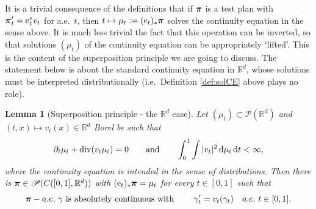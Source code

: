 \documentclass[11pt]{article}
\numberwithin{equation}{section}
\newtheorem{lemma}[theorem]{Lemma}
\newcommand{\R}{\mathbb{R}}
\newcommand{\ppi}{{\mbox{\boldmath$\pi$}}}
\newcommand{\pr}{\mathscr P}
\newcommand{\e}{{\rm e}}
\renewcommand{\d}{{\rm d}}
\renewcommand{\div}{{\rm div}}
\begin{document}
It is a trivial consequence of the definitions that if $\ppi$ is a test plan with $\ppi'_t=\e_t^*v_t$ for a.e.\ $t$, then $t\mapsto\mu_t:=(\e_t)_*\ppi$ solves the continuity equation in the sense above.
It is much less trivial the fact that this operation can be inverted, so that solutions $(\mu_t)$ of the continuity equation can be appropriately  `lifted'. This is the content of the superposition principle we are going to discuss. The statement below is about the standard continuity equation in $\R^d$, whose solutions must be interpreted distributionally (i.e.\ Definition \ref{def:solCE} above plays no role).
\begin{lemma}[Superposition principle - the $\R^d$ case]\label{le:suprd}
Let $(\mu_t)\subset \pr(\R^d)$ and $(t,x)\mapsto v_t(x)\in \R^d$ Borel be such that
\[
\partial_t\mu_t+\div(v_t\mu_t)=0\qquad\text{and}\qquad \int_0^1\int|v_t|^2\,\d\mu_t\,\d t<\infty,
\]
where the continuity equation is intended in the sense of distributions. Then there is $\ppi\in\pr(C([0,1],\R^d))$   with  $(\e_t)_*\ppi=\mu_t$ for every $t\in[0,1]$ such that
\begin{equation}
\label{eq:ode}
\ppi-a.e.\ \gamma\text{ is absolutely continuous with }\qquad\gamma'_t=v_t(\gamma_t)\quad a.e.\ t\in[0,1].%
\end{equation}
\end{lemma}
\end{document}
